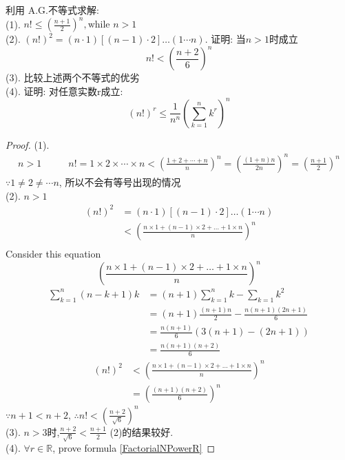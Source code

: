 \begin{example}
	利用 A.G.不等式求解:\\
	(1). $ n! \leqslant (\frac{n+1}{2})^n, \text{while } n >1 $\\
	(2). $ (n!)^2 = (n\cdot 1)[(n-1)\cdot 2]\dots (1\cdots n) $. 证明: 当$ n > 1 $时成立
	\[n!< (\frac{n+2}{6})^n\]
	(3). 比较上述两个不等式的优劣\\
	(4). 证明: 对任意实数r成立:
	\begin{equation}\label{FactorialNPowerR}
		(n!)^r\leqslant  \frac{1}{n^n} (\sum_{k=1}^n k^r)^n 
	\end{equation}
	\begin{proof}
		(1).
		\begin{align*}
			n>1 \qquad & n! = 1 \times 2 \times \cdots \times n < (\frac{1+2+\cdots + n}{n})^n = (\frac{(1+n)n}{2n})^n = (\frac{n+1}{2})^n
		\end{align*}
		$ \because 1 \neq 2 \neq \cdots n $, 所以不会有等号出现的情况\\
		(2). $ n > 1 $
		\begin{align*}		
			 (n!)^2 
			 & = (n\cdot 1)[(n-1)\cdot 2]\dots (1\cdots n)\\
			 & < (\frac{n\times1 + (n-1)\times 2 + \dots + 1\times n}{n})^n\\
		\end{align*}
		Consider this equation 
		\begin{equation}\label{keyn1nminus12}
			 (\frac{n\times1 + (n-1)\times 2 + \dots + 1\times n}{n})^n 
		\end{equation}
		\begin{align*}
			\sum_{k=1}^n (n-k+1)k 
			& = (n+1)\sum_{k=1}^nk - \sum_{k=1} k^2\\
			& = (n+1)\frac{(n+1)n}{2} - \frac{n(n+1)(2n+1)}{6}\\	
			& = \frac{n(n+1)}{6}(3(n+1) - (2n+1))\\
			& = \frac{n(n+1)(n+2)}{6}
		\end{align*}
		\begin{align*}		
			(n!)^2 
			& <  (\frac{n\times1 + (n-1)\times 2 + \dots + 1\times n}{n})^n\\
			& = (\frac{(n+1)(n+2)}{6})^n
		\end{align*}
		$ \because n+1<n+2 $,
		$ \therefore n! < (\frac{n+2}{\sqrt{6}})^n $\\
		(3). $ n>3 $时,$ \frac{n+2}{\sqrt{6}} < \frac{n+1}{2} $ (2)的结果较好.\\
		(4). $  \forall r\in \mathbb{R} $, prove formula \ref{FactorialNPowerR}

\end{proof}
\end{example}
